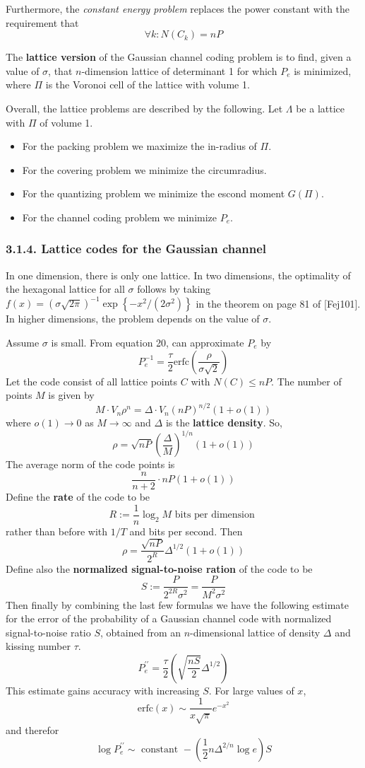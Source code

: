 \documentclass{article}
\renewcommand{\tt}[1]{\text{ #1 }}
\renewcommand{\=}{\equiv}
\newcommand{\erfc}{\text{erfc}}
\renewcommand{\i}{^{-1}}
\newcommand{\ra}{\rightarrow}
\newcommand{\pp}{^{\prime\prime}}
\newcommand{\ass}[1]{\left( #1 \right)}
\newcommand{\set}[1]{\left\{ #1 \right\}}
\begin{document}
Furthermore, the \textit{constant energy problem} replaces the power constant with the requirement that
$$ \forall k: N(C_k) = nP $$

The \textbf{lattice version} of the Gaussian channel coding problem is to find, given a value of $\sigma$, that $n$-dimension lattice of determinant 1 for which $P_e$ is minimized, where $\Pi$ is the Voronoi cell of the lattice with volume 1.

Overall, the lattice problems are described by the following.
Let $\Lambda$ be a lattice with $\Pi$ of volume 1.
\begin{itemize}
  \item For the packing problem we maximize the in-radius of $\Pi$.
  \item For the covering problem we minimize the circumradius.
  \item For the quantizing problem we minimize the escond moment $G(\Pi)$.
  \item For the channel coding problem we minimize $P_e$.
\end{itemize}

\subsubsection*{3.1.4. Lattice codes for the Gaussian channel}

In one dimension, there is only one lattice.
In two dimensions, the optimality of the hexagonal lattice for all $\sigma$ follows by taking $f(x) = (\sigma \sqrt{2\pi})\i \exp\set{-x^2/(2\sigma^2)}$ in the theorem on page 81 of [Fej101].
In higher dimensions, the problem depends on the value of $\sigma$.

Assume $\sigma$ is small.
From equation 20, can approximate $P_e$ by
$$ P_e\i = \frac{\tau}{2} \erfc \ass{\frac{\rho}{\sigma\sqrt 2}} $$
Let the code consist of all lattice points $C$ with $N(C) \leq nP$.
The number of points $M$ is given by
$$ M \cdot V_n \rho^n = \Delta \cdot V_n (nP)^{n/2} (1 + o(1)) $$
where $o(1) \ra 0$ as $M \ra \infty$
and $\Delta$ is the \textbf{lattice density}.
So,
$$ \rho = \sqrt{nP} \ass{\frac{\Delta}{M}}^{1/n} (1 + o(1)) $$
The average norm of the code points is
$$ \frac{n}{n+2} \cdot n P (1 + o(1)) $$
Define the \textbf{rate} of the code to be
$$ R := \frac{1}{n} \log_2 M \tt{bits per dimension} $$
rather than before with $1/T$ and bits per second.
Then
$$ \rho = \frac{\sqrt{nP}}{2^R} \Delta^{1/2} (1 + o(1)) $$
Define also the \textbf{normalized signal-to-noise ration} of the code to be
$$ S := \frac{P}{2^{2R}\sigma^2} = \frac{P}{M^2 \sigma^2} $$
Then finally by combining the last few formulas we have the following estimate for the error of the probability of a Gaussian channel code with normalized signal-to-noise ratio $S$, obtained from an $n$-dimensional lattice of density $\Delta$ and kissing number $\tau$.
$$ P_e\pp = \frac{\tau}{2} \ass{ \sqrt{\frac{nS}{2}} \Delta^{1/2} } $$
This estimate gains accuracy with increasing $S$.
For large values of $x$,
$$ \erfc(x) \sim \frac{1}{x \sqrt{\pi}} e^{-x^2} $$
and therefor
$$ \log P_e\pp \sim \tt{constant} - \ass{ \frac{1}{2} n \Delta^{2/n} \log e } S $$
\end{document}
